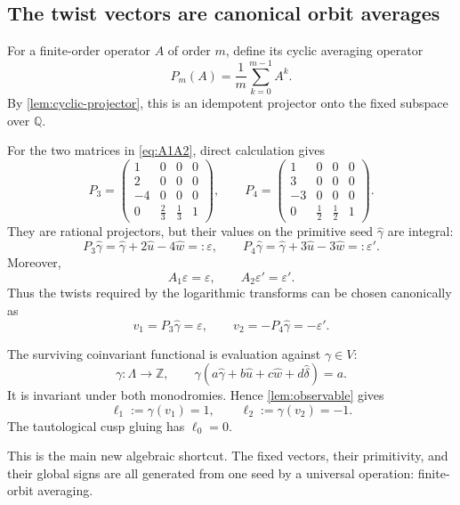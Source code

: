 \documentclass[11pt,reqno]{amsart}
\numberwithin{equation}{section}
\newcommand{\Z}{\mathbb Z}
\newcommand{\Q}{\mathbb Q}
\newcommand{\eps}{\varepsilon}
\newcommand{\epsp}{\varepsilon'}
\newcommand{\wideg}{\widehat\gamma}
\newcommand{\wideu}{\widehat u}
\newcommand{\widew}{\widehat w}
\newcommand{\wided}{\widehat\delta}
\theoremstyle{definition}
\begin{document}
\subsection{The twist vectors are canonical orbit averages}\label{sec:projectors}

For a finite-order operator $A$ of order $m$, define its cyclic averaging operator
\[
P_m(A)=\frac1m\sum_{k=0}^{m-1}A^k.
\]
By \cref{lem:cyclic-projector}, this is an idempotent projector onto the fixed subspace over $\Q$.

For the two matrices in \cref{eq:A1A2}, direct calculation gives
\begin{equation}\label{eq:P3P4}
P_3=
\begin{pmatrix}
1&0&0&0\\
2&0&0&0\\
-4&0&0&0\\
0&\frac23&\frac13&1
\end{pmatrix},
\qquad
P_4=
\begin{pmatrix}
1&0&0&0\\
3&0&0&0\\
-3&0&0&0\\
0&\frac12&\frac12&1
\end{pmatrix}.
\end{equation}
They are rational projectors, but their values on the primitive seed $\wideg$ are integral:
\begin{equation}\label{eq:projected-twists}
P_3\wideg=\wideg+2\wideu-4\widew=:\eps,
\qquad
P_4\wideg=\wideg+3\wideu-3\widew=:\epsp.
\end{equation}
Moreover,
\[
A_1\eps=\eps,
\qquad
A_2\epsp=\epsp.
\]
Thus the twists required by the logarithmic transforms can be chosen canonically as
\begin{equation}\label{eq:v1v2}
v_1=P_3\wideg=\eps,
\qquad
v_2=-P_4\wideg=-\epsp.
\end{equation}

The surviving coinvariant functional is evaluation against $\gamma\in V$:
\[
\gamma:\Lambda\longrightarrow\Z,
\qquad
\gamma(a\wideg+b\wideu+c\widew+d\wided)=a.
\]
It is invariant under both monodromies. Hence \cref{lem:observable} gives
\begin{equation}\label{eq:ell-values}
\ell_1:=\gamma(v_1)=1,
\qquad
\ell_2:=\gamma(v_2)=-1.
\end{equation}
The tautological cusp gluing has $\ell_0=0$.

This is the main new algebraic shortcut. The fixed vectors, their primitivity, and their global signs are all generated from one seed by a universal operation: finite-orbit averaging.
\end{document}
